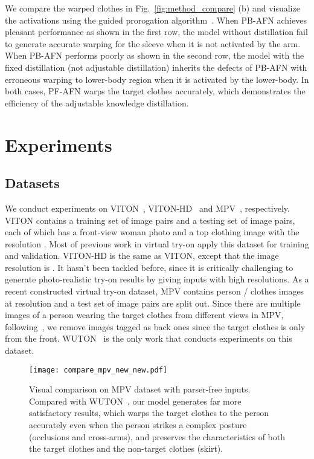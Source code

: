 \documentclass[final]{cvpr}
\begin{document}
We compare the warped clothes in Fig.~\ref{fig:method_compare} (b) and visualize the activations using the guided prorogation algorithm~\cite{guided}.
When PB-AFN achieves pleasant performance as shown in the first row, the model without distillation fail to generate accurate warping for the sleeve when it is not activated by the arm.
When PB-AFN performs poorly as shown in the second row, the model with the fixed distillation (not adjustable distillation) inherits the defects of PB-AFN with erroneous warping to lower-body region when it is activated by the lower-body.
In both cases, PF-AFN warps the target clothes accurately, which demonstrates the efficiency of the adjustable knowledge distillation. 
	
\section{Experiments}
	\subsection{Datasets}
	We conduct experiments on VITON~\cite{viton}, VITON-HD~\cite{viton} and MPV~\cite{MPV}, respectively.
VITON contains a training set of  image pairs and a testing set of  image pairs, each of which has a front-view woman photo and a top clothing image with the resolution .
Most of previous work in virtual try-on apply this dataset for training and validation.
VITON-HD is the same as VITON, except that the image resolution is .
It hasn't been tackled before, since it is critically challenging to generate photo-realistic try-on results by giving inputs with high resolutions.
As a recent constructed virtual try-on dataset, MPV contains  person / clothes images at  resolution and a test set of  image pairs are split out.
Since there are multiple images of a person wearing the target clothes from different views in MPV, following~\cite{parser_free}, we remove images tagged as back ones since the target clothes is only from the front.
WUTON~\cite{parser_free} is the only work that conducts experiments on this dataset.
	
	
	\begin{figure*}
		\begin{center}
			\texttt{[image: compare\_mpv\_new\_new.pdf]}
		\end{center}
		\vspace{-3mm}
		\caption{Visual comparison on MPV dataset with parser-free inputs. Compared with WUTON~\cite{parser_free}, our model generates far more satisfactory results, which warps the target clothes to the person accurately even when the person strikes a complex posture (\ie occlusions and cross-arms), and preserves the characteristics of both the target clothes and the non-target clothes (\ie skirt).}
		\vspace{-10pt}
		\label{fig:vis_mpv}
	\end{figure*}
	
\end{document}
